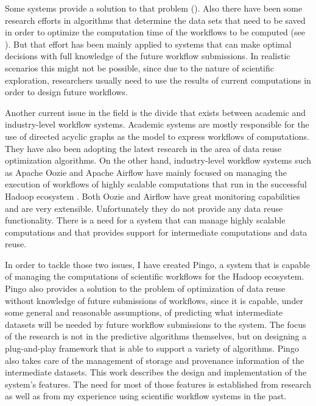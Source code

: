 Some systems provide a solution to that problem (\cite{yuan2012data}). Also there have been some research efforts in algorithms that determine the data sets that need to be saved in order to optimize the computation time of the workflows to be computed (see \cite{zohrevandi2013bounded}). But that effort has been mainly applied to systems that can make optimal decisions with full knowledge of the future workflow submissions.  In realistic scenarios this might not be possible, since due to the nature of scientific exploration, researchers usually need to use the results of current computations in order to design future workflows.

Another current issue in the field is the divide that exists between academic and industry-level workflow systems.  Academic systems are mostly responsible for the use of directed acyclic graphs as the model to express workflows of computations.  They have also been adopting the latest research in the area of data reuse optimization algorithms.  On the other hand, industry-level workflow systems such as Apache Oozie \citep{islam2012oozie} and Apache Airflow \citep{airflow}  have mainly focused on managing the execution of workflows of highly scalable computations that run in the successful Hadoop ecosystem \citep{white2012hadoop}. Both Oozie and Airflow have great monitoring capabilities and are very extensible. Unfortunately they do not provide any data reuse functionality.  There is a need for a system that can manage highly scalable computations and that provides support for intermediate computations and data reuse.

In order to tackle those two issues, I have created Pingo, a system that is capable of managing the computations of scientific workflows for the Hadoop ecosystem. Pingo also provides a solution to the problem of optimization of data reuse without knowledge of future submissions of workflows, since it is capable, under some general and reasonable assumptions, of predicting what intermediate datasets will be needed by future workflow submissions to the system. The focus of the research is not in the predictive algorithms themselves, but on designing a plug-and-play framework that is able to support a variety of algorithms. Pingo also takes care of the management of storage and provenance information of the intermediate datasets. This work describes the design and implementation of the system's features.  The need for most of those features is established from research as well as from my experience using scientific workflow systems in the past. 

